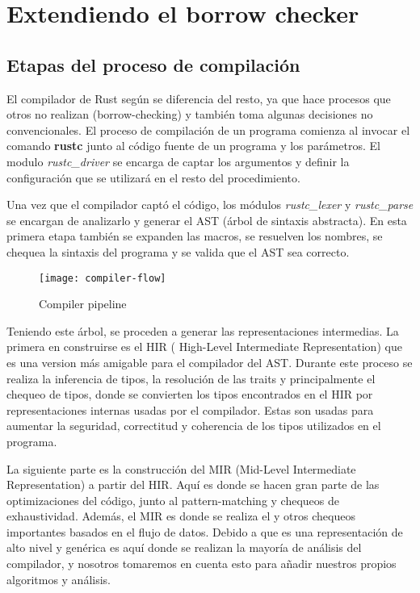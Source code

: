 \chapter{Extendiendo el borrow checker}

\section{Etapas del proceso de compilación}

El compilador de Rust según \cite{rustcdevelopment} se diferencia del resto, ya que hace procesos que otros no realizan (borrow-checking) y también toma algunas decisiones no convencionales. El proceso de compilación de un programa comienza al invocar el comando \textbf{rustc} junto al código fuente de un programa y los parámetros. El modulo \textit{rustc\_driver} se encarga de captar los argumentos y definir la configuración que se utilizará en el resto del procedimiento.

Una vez que el compilador captó el código, los módulos \textit{rustc\_lexer} y \textit{rustc\_parse} se encargan de analizarlo y generar el AST (árbol de sintaxis abstracta). En esta primera etapa también se expanden las macros, se resuelven los nombres, se chequea la sintaxis del programa y se valida que el AST sea correcto.

\begin{wrapfigure}{r}{0.25\textwidth}
    \caption{Compiler pipeline}
    \centering
    \texttt{[image: compiler-flow]}
\end{wrapfigure}

Teniendo este árbol, se proceden a generar las representaciones intermedias. La primera en construirse es el HIR ( High-Level Intermediate Representation) que es una version más amigable para el compilador del AST. Durante este proceso se realiza la inferencia de tipos, la resolución de las traits y principalmente el chequeo de tipos, donde se convierten los tipos encontrados en el HIR por representaciones internas usadas por el compilador. Estas son usadas para aumentar la seguridad, correctitud y coherencia de los tipos utilizados en el programa.

La siguiente parte es la construcción del MIR (Mid-Level Intermediate Representation) a partir del HIR. Aquí es donde se hacen gran parte de las optimizaciones del código, junto al pattern-matching y chequeos de exhaustividad. Además, el MIR es donde se realiza el  y otros chequeos importantes basados en el flujo de datos. Debido a que es una representación de alto nivel y genérica es aquí donde se realizan la mayoría de análisis del compilador, y nosotros tomaremos en cuenta esto para añadir nuestros propios algoritmos y análisis.

